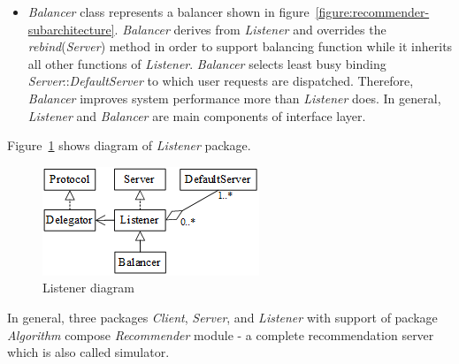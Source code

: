 \documentclass[a4paper,twoside]{article}
\begin{document}
\begin{itemize}
\item \textit{Balancer} class represents a balancer shown in figure~\ref{figure:recommender-subarchitecture}. \textit{Balancer} derives from \textit{Listener} and overrides the \textit{rebind}(\textit{Server}) method in order to support balancing function while it inherits all other functions of \textit{Listener}. \textit{Balancer} selects least busy binding \textit{Server}::\textit{DefaultServer} to which user requests are dispatched. Therefore, \textit{Balancer} improves system performance more than \textit{Listener} does. In general, \textit{Listener} and \textit{Balancer} are main components of interface layer.
\end{itemize}
Figure~\ref{figure:listener-diagram} shows diagram of \textit{Listener} package.
\begin{figure}
\centering
\includegraphics{ListenerDiagram.png}
\caption{Listener diagram}
\label{figure:listener-diagram}
\end{figure}

In general, three packages \textit{Client}, \textit{Server}, and \textit{Listener} with support of package \textit{Algorithm} compose \textit{Recommender} module - a complete recommendation server which is also called simulator.
\end{document}
